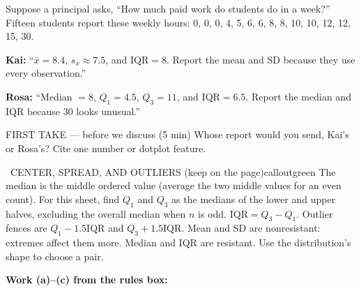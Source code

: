 \documentclass[11pt]{article}
\begin{document}


Suppose a principal asks, ``How much paid work do students do in a week?'' Fifteen students report these weekly hours: 0, 0, 0, 4, 5, 6, 6, 8, 8, 10, 10, 12, 12, 15, 30.\par\smallskip \textbf{Kai:} ``$\bar{x}=8.4$, $s_x\approx7.5$, and $\mathrm{IQR}=8$. Report the mean and SD because they use every observation.''\par \textbf{Rosa:} ``Median $=8$, $Q_1=4.5$, $Q_3=11$, and $\mathrm{IQR}=6.5$. Report the median and IQR because 30 looks unusual.''\par
\begin{center}
\end{center}
\begin{firsttakebox}{FIRST TAKE --- before we discuss (5 min)}
Whose report would you send, Kai's or Rosa's? Cite one number or dotplot feature.
\workspace{0.9in}
\end{firsttakebox}

\begin{callout}{\IconBook\ CENTER, SPREAD, AND OUTLIERS (keep on the page)}{calloutgreen}
The median is the middle ordered value (average the two middle values for an even count). For this sheet, find $Q_1$ and $Q_3$ as the medians of the lower and upper halves, excluding the overall median when $n$ is odd. $\mathrm{IQR}=Q_3-Q_1$. Outlier fences are $Q_1-1.5\mathrm{IQR}$ and $Q_3+1.5\mathrm{IQR}$. Mean and SD are nonresistant: extremes affect them more. Median and IQR are resistant. Use the distribution's shape to choose a pair.
\end{callout}

\newpage
\textbf{Work (a)--(c) from the rules box:}\par\smallskip
\end{document}
